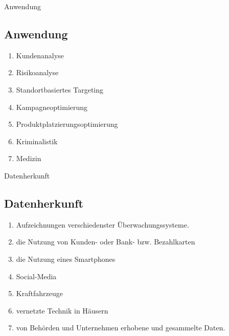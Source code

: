 \documentclass[11pt]{beamer}
\begin{document}
\begin{frame}{Anwendung}
\subsection{Anwendung}
	\begin{enumerate}
		\item Kundenanalyse
		\item Risikoanalyse
		\item Standortbasiertes Targeting
		\item Kampagneoptimierung
		\item Produktplatzierungsoptimierung
		\item Kriminalistik
		\item Medizin
	\end{enumerate}
\end{frame}


\begin{frame}{Datenherkunft}
\subsection{Datenherkunft}
\begin{enumerate}
\item Aufzeichnungen verschiedenster Überwachungssysteme.
\item die Nutzung von Kunden- oder Bank- bzw. Bezahlkarten 
\item die Nutzung eines Smartphones
\item Social-Media
\item Kraftfahrzeuge
\item vernetzte Technik in Häusern
\item von Behörden und Unternehmen erhobene und gesammelte Daten.

\end{enumerate}

\end{frame}
\end{document}
